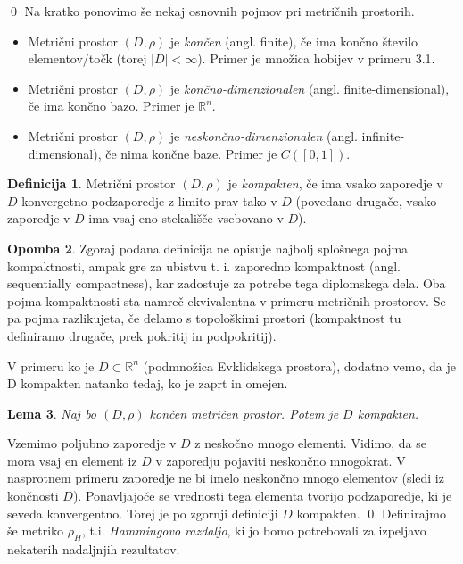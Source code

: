\documentclass[12pt,a4paper]{amsart}
\theoremstyle{definition} %
\newtheorem{definicija}{Definicija}[section]
\newtheorem{opomba}[definicija]{Opomba}
\theoremstyle{plain} %
\newtheorem{lema}[definicija]{Lema}
\begin{document}
\qed
\newline
\newline
Na kratko ponovimo še nekaj osnovnih pojmov pri metričnih prostorih.
\begin{itemize}
\item Metrični prostor $(D, \rho)$ je \textit{končen} (angl. finite), če ima končno število elementov/točk (torej $|D| < \infty$). Primer je množica hobijev v primeru 3.1.
\item Metrični prostor $(D, \rho)$ je \textit{končno-dimenzionalen} (angl. finite-dimensional), če ima končno bazo. Primer je $\mathbb{R}^n$.
\item Metrični prostor $(D, \rho)$ je \textit{neskončno-dimenzionalen} (angl. infinite-dimensional), če nima končne baze. Primer je $C([0,1])$.
\end{itemize}
\begin{definicija}
Metrični prostor $(D, \rho)$ je \textit{kompakten}, če ima vsako zaporedje v $D$ konvergetno podzaporedje z limito prav tako v $D$ (povedano drugače, vsako zaporedje v $D$ ima vsaj eno stekališče vsebovano v $D$).
\end{definicija}
\begin{opomba}
Zgoraj podana definicija ne opisuje najbolj splošnega pojma kompaktnosti, ampak gre za ubistvu t. i. zaporedno kompaktnost (angl. sequentially compactness), kar zadostuje za potrebe tega diplomskega dela. Oba pojma kompaktnosti sta namreč ekvivalentna v primeru metričnih prostorov. Se pa pojma razlikujeta, če delamo s topološkimi prostori (kompaktnost tu definiramo drugače, prek pokritij in podpokritij).
\end{opomba}
V primeru ko je $D \subset \mathbb{R}^n$ (podmnožica Evklidskega prostora), dodatno vemo, da je D kompakten natanko tedaj, ko je zaprt in omejen.
\begin{lema}
Naj bo $(D, \rho)$ končen metričen prostor. Potem je $D$ kompakten.
\end{lema}
\proof
Vzemimo poljubno zaporedje v $D$ z neskočno mnogo elementi. Vidimo, da se mora vsaj en element iz $D$ v zaporedju pojaviti neskončno mnogokrat. V nasprotnem primeru zaporedje ne bi imelo neskončno mnogo elementov (sledi iz končnosti $D$). Ponavljajoče se vrednosti tega elementa tvorijo podzaporedje, ki je seveda konvergentno. Torej je po zgornji definiciji $D$ kompakten.
\qed
\newline
\newline
Definirajmo še metriko $\rho_H$, t.i. \textit{Hammingovo razdaljo}, ki jo bomo potrebovali za izpeljavo nekaterih nadaljnjih rezultatov. 
\end{document}
